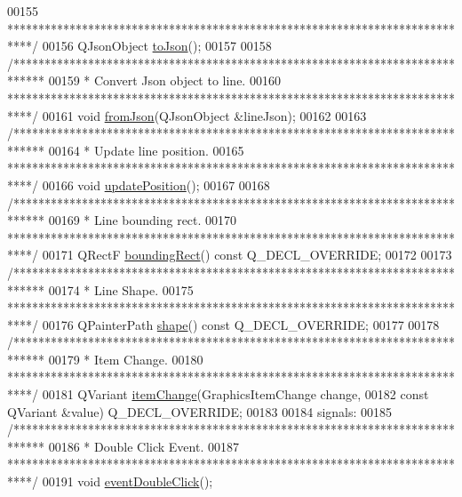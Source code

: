 \begin{DoxyCode}
00155 \textcolor{comment}{   ****************************************************************************/}
00156   QJsonObject \hyperlink{group___models_ga4effa7a96db465ea6e01135d5a010739}{toJson}();
00157 
00158   \textcolor{comment}{/*****************************************************************************}
00159 \textcolor{comment}{   * Convert Json object to line.}
00160 \textcolor{comment}{   ****************************************************************************/}
00161   \textcolor{keywordtype}{void} \hyperlink{group___models_ga62623ad71df5279377cc69da90decc75}{fromJson}(QJsonObject &lineJson);
00162 
00163   \textcolor{comment}{/*****************************************************************************}
00164 \textcolor{comment}{   * Update line position.}
00165 \textcolor{comment}{   ****************************************************************************/}
00166   \textcolor{keywordtype}{void} \hyperlink{group___models_ga8fdb12651d4bc592616d241386b066b3}{updatePosition}();
00167 
00168   \textcolor{comment}{/*****************************************************************************}
00169 \textcolor{comment}{   * Line bounding rect.}
00170 \textcolor{comment}{   ****************************************************************************/}
00171   QRectF \hyperlink{group___models_gad15c3af158d3b966c04be7e18cee5aea}{boundingRect}() const Q\_DECL\_OVERRIDE;
00172 
00173   \textcolor{comment}{/*****************************************************************************}
00174 \textcolor{comment}{   * Line Shape.}
00175 \textcolor{comment}{   ****************************************************************************/}
00176   QPainterPath \hyperlink{group___models_gaf1736b829a643d99052ef6428ddd5b16}{shape}() const Q\_DECL\_OVERRIDE;
00177 
00178   \textcolor{comment}{/*****************************************************************************}
00179 \textcolor{comment}{   * Item Change.}
00180 \textcolor{comment}{   ****************************************************************************/}
00181   QVariant \hyperlink{group___models_ga5fcee3f23eb50e34f730d602a3802b93}{itemChange}(GraphicsItemChange change,
00182                       const QVariant &value) Q\_DECL\_OVERRIDE;
00183 
00184 signals:
00185   \textcolor{comment}{/*****************************************************************************}
00186 \textcolor{comment}{   * Double Click Event.}
00187 \textcolor{comment}{   ****************************************************************************/}
00191   \textcolor{keywordtype}{void} \hyperlink{class_line_a2444b577ea2254994599c6f829c629a5}{eventDoubleClick}();

\end{DoxyCode}
